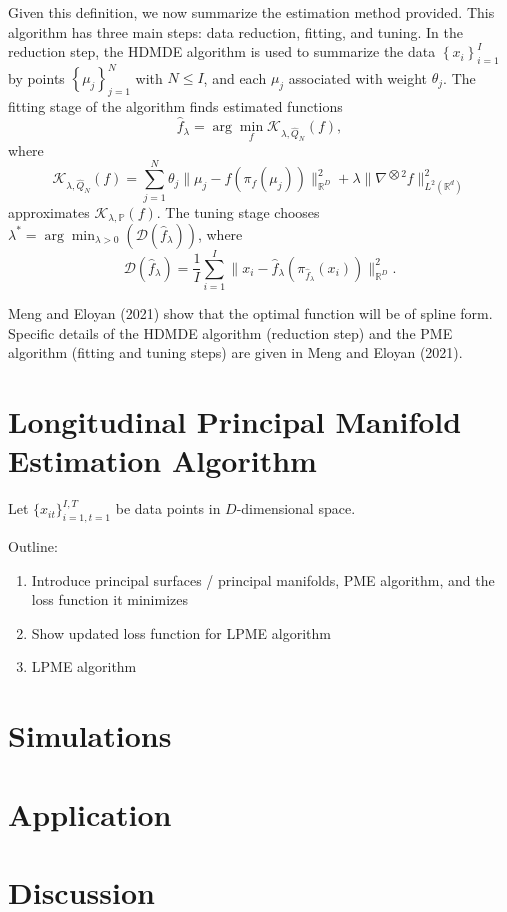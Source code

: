 \documentclass[11pt,reqno]{article}
\begin{document}
Given this definition, we now summarize the estimation method provided. This algorithm has three main steps: data reduction, fitting, and tuning. In the reduction step, the HDMDE algorithm is used to summarize the data $\left\{x_i\right\}_{i=1}^{I}$ by points $\left\{\mu_j\right\}_{j=1}^{N}$ with $N \leq I$, and each $\mu_j$ associated with weight $\theta_j$. The fitting stage of the algorithm finds estimated functions 
\[%
  \hat{f}_\lambda = \arg\min_f \mathcal{K}_{\lambda, \hat{Q}_N}(f)
,\]%
where 
\[%
  \mathcal{K}_{\lambda, \hat{Q}_N}(f) = \sum_{j = 1}^{N}\theta_j \|\mu_j - f(\pi_f(\mu_j))\|_{\mathbb{R}^{D}}^2 + \lambda\|\nabla^{\bigotimes 2}f\|_{L^2(\mathbb{R}^{d})}^2
\]%
approximates $\mathcal{K}_{\lambda, \mathbb{P}}(f)$. The tuning stage chooses $\lambda^{*} = \arg\min_{\lambda > 0}(\mathcal{D}(\hat{f}_\lambda))$, where 
\[%
  \mathcal{D}(\hat{f}_\lambda) = \frac{1}{I}\sum_{i=1}^{I}\|x_i - \hat{f}_\lambda(\pi_{\hat{f}_\lambda}(x_i))\|_{\mathbb{R}^{D}}^2
.\]%

Meng and Eloyan (2021) show that the optimal function will be of spline form. Specific details of the HDMDE algorithm (reduction step) and the PME algorithm (fitting and tuning steps) are given in Meng and Eloyan (2021).

\section{Longitudinal Principal Manifold Estimation Algorithm}

Let $\{x_{it}\}_{i=1, t=1}^{I, T}$ be data points in $D$-dimensional space.

Outline:
\begin{enumerate}
    \item Introduce principal surfaces / principal manifolds, PME algorithm, and the loss function it minimizes
    \item Show updated loss function for LPME algorithm
    \item LPME algorithm
\end{enumerate}

\section{Simulations}

\section{Application}

\section{Discussion}
\end{document}
